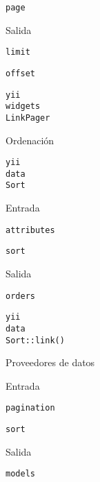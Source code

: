 \begin{longenum}
\begin{longenum}
\begin{longenum}
\begin{longenum}
                \item \texttt{page}
            \end{longenum}
            \item Salida
            \begin{longenum}
                \item \texttt{limit}
                \item \texttt{offset}
            \end{longenum}
            \item \texttt{yii\\widgets\\LinkPager}
        \end{longenum}
        \item Ordenación
        \begin{longenum}
            \item \texttt{yii\\data\\Sort}
            \item Entrada
            \begin{longenum}
                \item \texttt{attributes}
                \item \texttt{sort}
            \end{longenum}
            \item Salida
            \begin{longenum}
                \item \texttt{orders}
            \end{longenum}
            \item \texttt{yii\\data\\Sort::link()}
        \end{longenum}
        \item Proveedores de datos
        \begin{longenum}
            \item Entrada
            \begin{longenum}
                \item \texttt{pagination}
                \item \texttt{sort}
            \end{longenum}
            \item Salida
            \begin{longenum}
                \item \texttt{models}

\end{longenum}
\end{longenum}
\end{longenum}
\end{longenum}
